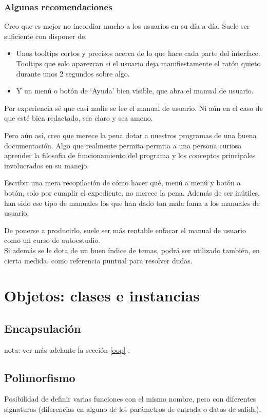 \documentclass[spanish,12pt,a4paper,final,oneside]{book}
\begin{document}
\subsection*{Algunas recomendaciones}
Creo que es mejor no incordiar mucho a los usuarios en su día a día. Suele ser suficiente con disponer de:
\begin{itemize}
\item Unos tooltips cortos y precisos acerca de lo que hace cada parte del interface. Tooltips que solo aparezcan si el usuario deja manifiestamente el ratón quieto durante unos 2 segundos sobre algo. 
\item Y un menú o botón de `Ayuda' bien visible, que abra el manual de usuario.
\end{itemize}

Por experiencia sé que casi nadie se lee el manual de usuario. Ni aún en el caso de que esté bien redactado, sea claro y sea ameno.

Pero aún así, creo que merece la pena dotar a nuestros programas de una buena documentación. Algo que realmente permita permita a una persona curiosa aprender la filosofia de funcionamiento del programa y los conceptos principales involucrados en su manejo.

Escribir una mera recopilación de cómo hacer qué, menú a menú y botón a botón, solo por cumplir el expediente, no merece la pena. Además de ser inútiles, han sido ese tipo de manuales los que han dado tan mala fama a los manuales de usuario.

De ponerse a producirlo, suele ser más rentable enfocar el manual de usuario como un curso de autoestudio.
\\Si además se le dota de un buen índice de temas, podrá ser utilizado también, en cierta medida, como referencia puntual para resolver dudas.

\chapter{Objetos: clases e instancias}

\section{Encapsulación}
nota: ver más adelante la sección \ref{oop} .

\section{Polimorfismo}
Posibilidad de definir varias funciones con el mismo nombre, pero con diferentes signaturas (diferencias en alguno de los parámetros de entrada o datos de salida).
\end{document}
